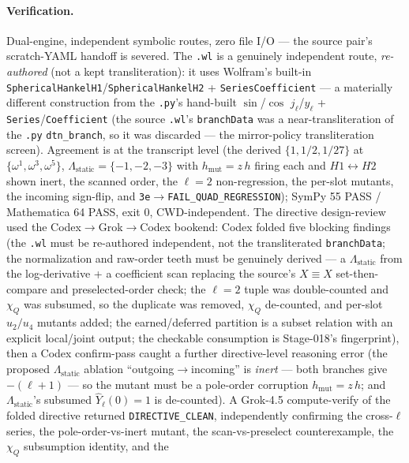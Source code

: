 \paragraph{Verification.}
Dual-engine, independent symbolic routes, zero file I/O --- the source pair's scratch-YAML handoff is severed. The \texttt{.wl}
is a genuinely independent route, \emph{re-authored} (not a kept transliteration): it uses Wolfram's built-in
\texttt{SphericalHankelH1}/\texttt{SphericalHankelH2} + \texttt{SeriesCoefficient} --- a materially different construction from
the \texttt{.py}'s hand-built \(\sin\)/\(\cos\) \(j_\ell\)/\(y_\ell\) + \texttt{Series}/\texttt{Coefficient} (the source
\texttt{.wl}'s \texttt{branchData} was a near-transliteration of the \texttt{.py} \texttt{dtn\_branch}, so it was discarded ---
the mirror-policy transliteration screen). Agreement is at the transcript level (the derived \(\{1,1/2,1/27\}\) at
\(\{\omega^1,\omega^3,\omega^5\}\), \(\Lambda_{\mathrm{static}}=\{-1,-2,-3\}\) with \(h_{\mathrm{mut}}=z\,h\) firing each and
\(H1\leftrightarrow H2\) shown inert, the scanned order, the \(\ell=2\) non-regression, the per-slot mutants, the incoming
sign-flip, and \texttt{3e}\(\to\)\texttt{FAIL\_QUAD\_REGRESSION}); SymPy 55 PASS / Mathematica 64 PASS, exit 0, CWD-independent.
The directive design-review used the Codex\(\to\)Grok\(\to\)Codex bookend: Codex folded five blocking findings (the \texttt{.wl}
must be re-authored independent, not the transliterated \texttt{branchData}; the normalization and raw-order teeth must be
genuinely derived --- a \(\Lambda_{\mathrm{static}}\) from the log-derivative + a coefficient scan replacing the source's
\(X\equiv X\) set-then-compare and preselected-order check; the \(\ell=2\) tuple was double-counted and \(\chi_Q\) was
subsumed, so the duplicate was removed, \(\chi_Q\) de-counted, and per-slot \(u_2/u_4\) mutants added; the earned/deferred
partition is a subset relation with an explicit local/joint output; the checkable consumption is Stage-018's fingerprint), then
a Codex confirm-pass caught a further directive-level reasoning error (the proposed \(\Lambda_{\mathrm{static}}\) ablation
``outgoing\(\to\)incoming'' is \emph{inert} --- both branches give \(-(\ell+1)\) --- so the mutant must be a pole-order
corruption \(h_{\mathrm{mut}}=z\,h\); and \(\Lambda_{\mathrm{static}}\)'s subsumed \(\hat Y_\ell(0)=1\) is de-counted). A
Grok-4.5 compute-verify of the folded directive returned \texttt{DIRECTIVE\_CLEAN}, independently confirming the cross-\(\ell\)
series, the pole-order-vs-inert mutant, the scan-vs-preselect counterexample, the \(\chi_Q\) subsumption identity, and the

